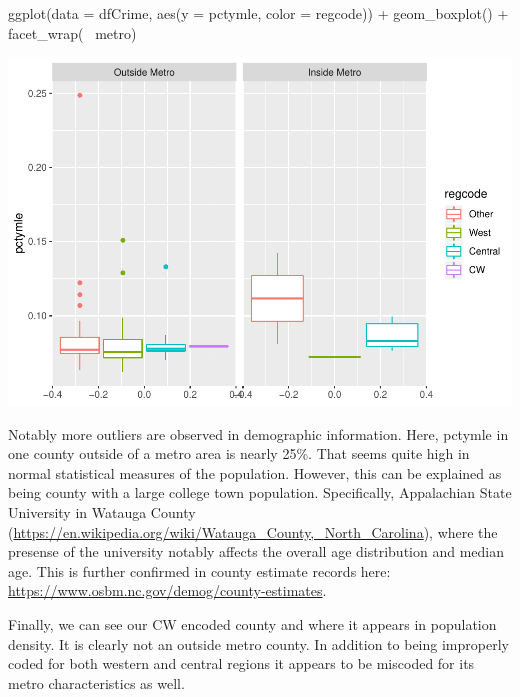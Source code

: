 \documentclass[]{article}
\newenvironment{Shaded}{}{}
\newcommand{\DataTypeTok}[1]{#1}
\newcommand{\KeywordTok}[1]{\textcolor[rgb]{0.00,0.00,1.00}{#1}}
\newcommand{\NormalTok}[1]{#1}
\newcommand{\OperatorTok}[1]{#1}
\newcommand{\StringTok}[1]{\textcolor[rgb]{0.00,0.50,0.50}{#1}}
\begin{document}
\begin{Shaded}
\begin{Highlighting}[]
\KeywordTok{ggplot}\NormalTok{(}\DataTypeTok{data =}\NormalTok{ dfCrime, }\KeywordTok{aes}\NormalTok{(}\DataTypeTok{y =}\NormalTok{ pctymle, }\DataTypeTok{color =}\NormalTok{ regcode)) }\OperatorTok{+}
\StringTok{      }\KeywordTok{geom_boxplot}\NormalTok{() }\OperatorTok{+}\StringTok{ }\KeywordTok{facet_wrap}\NormalTok{(}\OperatorTok{~}\StringTok{ }\NormalTok{metro)}
\end{Highlighting}
\end{Shaded}

\includegraphics{Bagnard_Gaustad_Hartman_Leung_Lab_3_files/figure-latex/unnamed-chunk-27-3.pdf}

Notably more outliers are observed in demographic information. Here,
pctymle in one county outside of a metro area is nearly 25\%. That seems
quite high in normal statistical measures of the population. However,
this can be explained as being county with a large college town
population. Specifically, Appalachian State University in Watauga County
(\url{https://en.wikipedia.org/wiki/Watauga_County,_North_Carolina}),
where the presense of the university notably affects the overall age
distribution and median age. This is further confirmed in county
estimate records here:
\url{https://www.osbm.nc.gov/demog/county-estimates}.

Finally, we can see our CW encoded county and where it appears in
population density. It is clearly not an outside metro county. In
addition to being improperly coded for both western and central regions
it appears to be miscoded for its metro characteristics as well.
\end{document}
